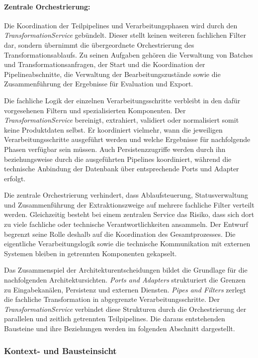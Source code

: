 \paragraph{Zentrale Orchestrierung:}

Die Koordination der Teilpipelines und Verarbeitungsphasen wird durch den \textit{TransformationService} gebündelt. Dieser stellt keinen weiteren fachlichen Filter dar, 
sondern übernimmt die übergeordnete Orchestrierung des Transformationsablaufs. Zu seinen Aufgaben gehören die Verwaltung von Batches und Transformationsanfragen, der Start 
und die Koordination der Pipelineabschnitte, die Verwaltung der Bearbeitungszustände sowie die Zusammenführung der Ergebnisse für Evaluation und Export.

Die fachliche Logik der einzelnen Verarbeitungsschritte verbleibt in den dafür vorgesehenen Filtern und spezialisierten Komponenten. Der \textit{TransformationService} 
bereinigt, extrahiert, validiert oder normalisiert somit keine Produktdaten selbst. Er koordiniert vielmehr, wann die jeweiligen Verarbeitungsschritte ausgeführt werden und 
welche Ergebnisse für nachfolgende Phasen verfügbar sein müssen. Auch Persistenzzugriffe werden durch ihn beziehungsweise durch die ausgeführten Pipelines koordiniert, während 
die technische Anbindung der Datenbank über entsprechende Ports und Adapter erfolgt.

Die zentrale Orchestrierung verhindert, dass Ablaufsteuerung, Statusverwaltung und Zusammenführung der Extraktionszweige auf mehrere fachliche Filter verteilt werden. 
Gleichzeitig besteht bei einem zentralen Service das Risiko, dass sich dort zu viele fachliche oder technische Verantwortlichkeiten ansammeln. Der Entwurf begrenzt seine 
Rolle deshalb auf die Koordination des Gesamtprozesses. Die eigentliche Verarbeitungslogik sowie die technische Kommunikation mit externen Systemen bleiben in getrennten 
Komponenten gekapselt.

Das Zusammenspiel der Architekturentscheidungen bildet die Grundlage für die nachfolgenden Architektursichten. \textit{Ports and Adapters} strukturiert die Grenzen zu 
Eingabekanälen, Persistenz und externen Diensten. \textit{Pipes and Filters} zerlegt die fachliche Transformation in abgegrenzte Verarbeitungsschritte. Der 
\textit{TransformationService} verbindet diese Strukturen durch die Orchestrierung der parallelen und zeitlich getrennten Teilpipelines. Die daraus entstehenden Bausteine und 
ihre Beziehungen werden im folgenden Abschnitt dargestellt.

\subsubsection{Kontext- und Bausteinsicht}

